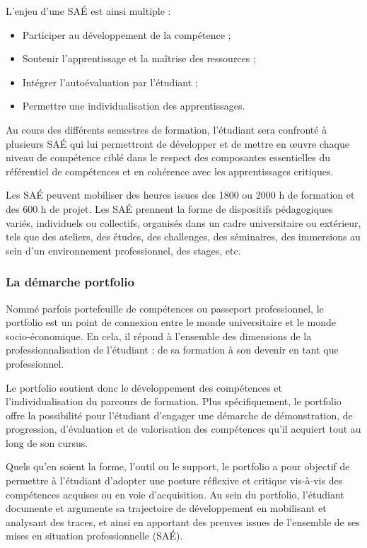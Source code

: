 \documentclass[10pt]{article}
\begin{document}
L’enjeu d’une SAÉ est ainsi multiple :
\begin{itemize}
\item Participer au développement de la compétence ;
\item Soutenir l’apprentissage et la maîtrise des ressources ;
\item Intégrer l’autoévaluation par l’étudiant ;
\item Permettre une individualisation des apprentissages.
\end{itemize}

Au cours des différents semestres de formation, l’étudiant sera
confronté à plusieurs SAÉ qui lui permettront de développer et de mettre
en œuvre chaque niveau de compétence ciblé dans le respect des
composantes essentielles du référentiel de compétences et en cohérence
avec les apprentissages critiques.

Les SAÉ peuvent mobiliser des heures issues des 1800 ou 2000 h de
formation et des 600 h de projet. Les SAÉ prennent la forme de
dispositifs pédagogiques variés, individuels ou collectifs, organisés
dans un cadre universitaire ou extérieur, tels que des ateliers, des
études, des challenges, des séminaires, des immersions au sein d’un
environnement professionnel, des stages, etc.

\subsubsection*{La démarche portfolio}%
\label{FICHE-\VAR{portfolio.id|le}}%

Nommé parfois portefeuille de compétences ou passeport professionnel, le
portfolio est un point de connexion entre le monde universitaire et le
monde socio-économique. En cela, il répond à l’ensemble des dimensions
de la professionnalisation de l’étudiant : de sa formation à son devenir
en tant que professionnel.

Le portfolio soutient donc le développement des compétences et
l’individualisation du parcours de formation.  Plus spécifiquement, le
portfolio offre la possibilité pour l’étudiant d’engager une démarche de
démonstration, de progression, d’évaluation et de valorisation des
compétences qu’il acquiert tout au long de son cursus.

Quels qu’en soient la forme, l’outil ou le support, le portfolio a pour
objectif de permettre à l’étudiant d’adopter une posture réflexive et
critique vis-à-vis des compétences acquises ou en voie d’acquisition. Au
sein du portfolio, l’étudiant documente et argumente sa trajectoire de
développement en mobilisant et analysant des traces, et ainsi en
apportant des preuves issues de l’ensemble de ses mises en situation
professionnelle (SAÉ).
\end{document}
